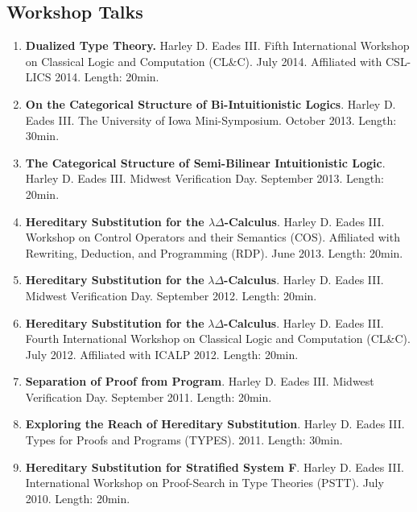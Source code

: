 \documentclass{article}
\begin{document}
  \subsection{Workshop Talks}
  \begin{enumerate}        
    \item \textbf{Dualized Type Theory.} Harley D. Eades III.
      Fifth International Workshop on Classical Logic and Computation (CL\&C). July 2014. Affiliated with
      CSL-LICS 2014. Length: 20min.
      
    \item \textbf{On the Categorical Structure of Bi-Intuitionistic Logics}. Harley D. Eades III.
      The University of Iowa Mini-Symposium. October 2013. Length: 30min.
      
    \item \textbf{The Categorical Structure of Semi-Bilinear Intuitionistic Logic}. Harley D. Eades III.
      Midwest Verification Day. September 2013. Length: 20min.
      
    \item \textbf{Hereditary Substitution for the $\lambda\Delta$-Calculus}. Harley D. Eades III. 
      Workshop on Control Operators and their Semantics (COS). 
      Affiliated with Rewriting, Deduction, and Programming (RDP). June 2013. Length: 20min.
      
    \item \textbf{Hereditary Substitution for the }$\lambda\Delta$\textbf{-Calculus}. Harley D. Eades III.
      Midwest Verification Day. September 2012. Length: 20min.
      
    \item \textbf{Hereditary Substitution for the }$\lambda\Delta$\textbf{-Calculus}. Harley D. Eades III.
      Fourth International Workshop on Classical Logic and Computation (CL\&C). July 2012. Affiliated with ICALP 2012.
      Length: 20min.
      
    \item \textbf{Separation of Proof from Program}.
      Harley D. Eades III. Midwest Verification Day. September 2011. Length: 20min.

    \item \textbf{Exploring the Reach of Hereditary Substitution}. Harley D. Eades III.
      Types for Proofs and Programs (TYPES). 2011. Length: 30min.
      
    \item \textbf{Hereditary Substitution for Stratified System F}. Harley D. Eades III. 
      International Workshop on Proof-Search in Type Theories (PSTT). July 2010. Length: 20min.
    \end{enumerate}
\end{document}
